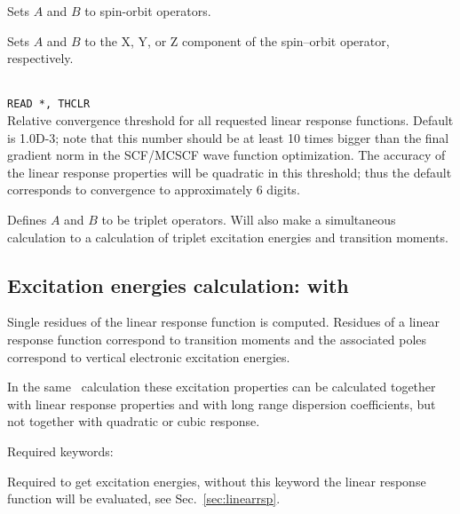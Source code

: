 \begin{description}
\item{}
Sets $A$ and $B$ to spin-orbit operators.

\item{}
Sets $A$ and $B$ to the X, Y, or Z component of the spin--orbit
operator, respectively.

\item{}\\
\verb|READ *, THCLR|\\
Relative convergence threshold for all requested linear response functions.
Default is 1.0D-3; note that this number should be at least 10 times
bigger than the final gradient norm in the SCF/MCSCF
wave function optimization. The accuracy of the linear response 
properties will be quadratic in this threshold; thus the default
corresponds to convergence to approximately 6 digits.

\item{} Defines $A$ and $B$ to be triplet operators.
Will also make a simultaneous   calculation to
a calculation of triplet excitation energies and transition moments.


\end{description}

\subsection{Excitation energies calculation:  with }

Single residues of the linear
response function is
computed. Residues of a linear response function correspond to
transition moments and the associated poles
correspond to vertical electronic excitation energies.

In the same \resp\ calculation these excitation properties can be calculated
together with linear response properties
and with long range dispersion coefficients, but not 
together with quadratic or cubic response.

Required keywords:

\begin{description}

\item{} Required to get excitation energies, without
this keyword the linear response function will be evaluated, see Sec.~\ref{sec:linearrsp}.

\end{description}

